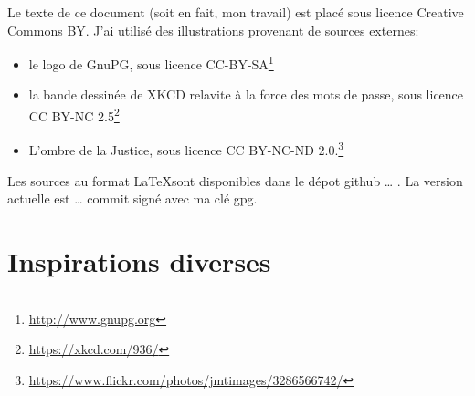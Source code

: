 \documentclass[10pt,a4paper,openany]{book}
\begin{document}
	Le texte de ce document (soit en fait, mon travail) est placé sous licence Creative Commons BY. J'ai utilisé des illustrations provenant de sources externes:
	\begin{itemize}
		\item le logo de GnuPG, sous licence CC-BY-SA\footnote{\url{http://www.gnupg.org}}
		\item la bande dessinée de XKCD relavite à la force des mots de passe, sous licence CC BY-NC 2.5\footnote{\url{https://xkcd.com/936/}}
		\item L'ombre de la Justice, sous licence CC BY-NC-ND 2.0.\footnote{\url{https://www.flickr.com/photos/jmtimages/3286566742/}}
	\end{itemize}
	
	Les sources au format \LaTeX sont disponibles dans le dépot github … . La version actuelle est … commit signé avec ma clé gpg.
	
	\tableofcontents
	
	
	
	
		
	
	
	
	
	\chapter{Inspirations diverses}
	
\end{document}
